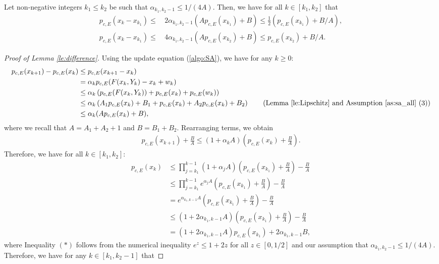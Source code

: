 \documentclass[11 pt]{article}
\begin{document}
	
	\begin{lemma}\label{le:difference}
		Let non-negative integers $k_1 \leq k_2$ be such that $\alpha_{k_1,k_2-1}\leq 1/(4A)$. Then, we have for all $k\in [k_1,k_2]$ that
		\begin{align*}
			p_{c,E}(x_k-x_{k_1})\leq\,& 2\alpha_{k_1,k_2-1}(Ap_{c,E}(x_{k_1})+B)\leq  \frac{1}{2}(p_{c,E}(x_{k_1})+B/A),\\
			p_{c,E}(x_k-x_{k_1})\leq\,& 4\alpha_{k_1,k_2-1}(Ap_{c,E}(x_{k_2})+B)\leq p_{c,E}(x_{k_2})+B/A.
		\end{align*}
	\end{lemma}
	\begin{proof}[Proof of Lemma \ref{le:difference}]
		Using the update equation (\ref{algo:SA}), we have for any $k\geq 0$:
		\begin{align*}
			p_{c,E}(x_{k+1})-p_{c,E}(x_k)&\leq p_{c,E}(x_{k+1}-x_k)\\
			&= \alpha_k p_{c,E}(F(x_k,Y_k)-x_k+w_k)\\
			&\leq  \alpha_k \left(p_{c,E}(F(x_k,Y_k))+p_{c,E}(x_k)+p_{c,E}(w_k)\right)\\
			&\leq  \alpha_k \left(A_1p_{c,E}(x_k)+B_1+p_{c,E}(x_k)+A_2p_{c,E}(x_k)+B_2\right)\tag{Lemma \ref{le:Lipschitz} and Assumption \ref{as:sa_all} (3)}\\
			&\leq \alpha_k (A p_{c,E}(x_k)+B),
		\end{align*}
		where we recall that $A=A_1+A_2+1$ and $B=B_1+B_2$. Rearranging terms, we obtain
		\begin{align*}
			p_{c,E}(x_{k+1})+\frac{B}{A}\leq (1+\alpha_k A)\left(p_{c,E}(x_k)+\frac{B}{A}\right).
		\end{align*}
		Therefore, we have for all $k\in [k_1,k_2]$:
		\begin{align*}
			p_{c,E}(x_k)&\leq \prod_{j=k_1}^{k-1}(1+\alpha_j A)\left(p_{c,E}(x_{k_1})+\frac{B}{A}\right)-\frac{B}{A}\nonumber\\
			&\leq \prod_{j=k_1}^{k-1}e^{\alpha_j A}\left(p_{c,E}(x_{k_1})+\frac{B}{A}\right)-\frac{B}{A}\nonumber\\
			&= e^{\alpha_{k_1,k-1} A}\left(p_{c,E}(x_{k_1})+\frac{B}{A}\right)-\frac{B}{A}\nonumber\\
			&\leq  \left(1+2\alpha_{k_1,k-1} A\right)\left(p_{c,E}(x_{k_1})+\frac{B}{A}\right)-\frac{B}{A}\tag{$*$}\\
			&=\left(1+2\alpha_{k_1,k-1} A\right)p_{c,E}(x_{k_1})+2\alpha_{k_1,k-1} B,\nonumber
		\end{align*}
		where Inequality $(*)$ follows from the numerical inequality $e^z\leq 1+2z$ for all $z\in [0, 1/2]$ and our assumption that $\alpha_{k_1,k_2-1}\leq 1/(4A)$. Therefore, we have for any $k\in [k_1,k_2-1]$ that

\end{proof}
\end{document}
